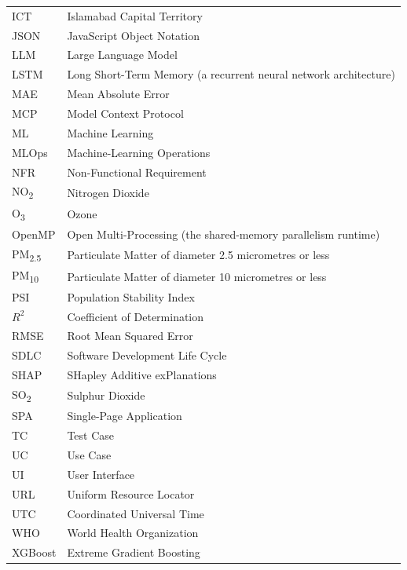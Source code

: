 \begin{xltabular}{\textwidth}{B Y}
ICT & Islamabad Capital Territory \\
JSON & JavaScript Object Notation \\
LLM & Large Language Model \\
LSTM & Long Short-Term Memory (a recurrent neural network architecture) \\
MAE & Mean Absolute Error \\
MCP & Model Context Protocol \\
ML & Machine Learning \\
MLOps & Machine-Learning Operations \\
NFR & Non-Functional Requirement \\
NO\textsubscript{2} & Nitrogen Dioxide \\
O\textsubscript{3} & Ozone \\
OpenMP & Open Multi-Processing (the shared-memory parallelism runtime) \\
PM\textsubscript{2.5} & Particulate Matter of diameter 2.5 micrometres or less \\
PM\textsubscript{10} & Particulate Matter of diameter 10 micrometres or less \\
PSI & Population Stability Index \\
$R^2$ & Coefficient of Determination \\
RMSE & Root Mean Squared Error \\
SDLC & Software Development Life Cycle \\
SHAP & SHapley Additive exPlanations \\
SO\textsubscript{2} & Sulphur Dioxide \\
SPA & Single-Page Application \\
TC & Test Case \\
UC & Use Case \\
UI & User Interface \\
URL & Uniform Resource Locator \\
UTC & Coordinated Universal Time \\
WHO & World Health Organization \\
XGBoost & Extreme Gradient Boosting \\
\end{xltabular}

